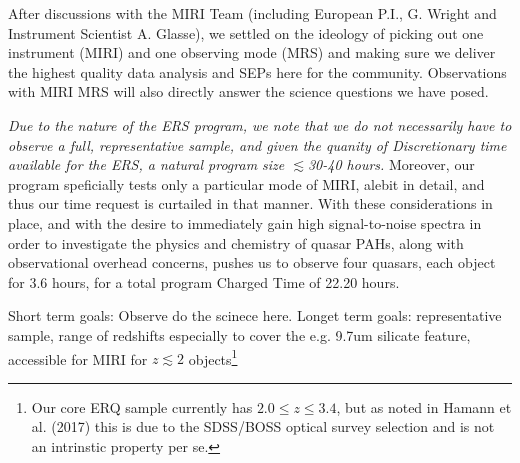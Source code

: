 \smallskip \smallskip
\noindent
After discussions with the MIRI Team (including European P.I.,
G. Wright and Instrument Scientist A. Glasse), we settled on the
ideology of picking out one instrument (MIRI) and one observing mode
(MRS) and making sure we deliver the highest quality data analysis and
SEPs here for the community. Observations with MIRI MRS will also
directly answer the science questions we have posed.

\smallskip \smallskip
\noindent
{\it Due to the nature of the ERS program, we note that we do not 
necessarily have to observe a full, representative sample, 
and given the quanity of Discretionary time available for the ERS, 
a natural program size $\lesssim$30-40 hours.} 
Moreover, our program speficially tests only a particular mode of 
MIRI, alebit in detail, and thus our time request is curtailed in that manner. 
With these considerations in place, and with the desire to immediately gain high signal-to-noise spectra
in order to investigate the physics and chemistry of quasar PAHs,
along with observational overhead concerns, pushes us to observe four 
quasars, each object for 3.6 hours, for a total program Charged Time of 22.20 hours.

\smallskip \smallskip
\noindent
Short term goals: Observe do the scinece here. 
Longet term goals: representative sample, range of redshifts 
especially to cover the e.g. 9.7um  silicate feature, accessible for MIRI 
for $z\lesssim2$ objects\footnote{Our core ERQ sample currently 
has $2.0 \leq z \leq3.4$, but as noted in Hamann et al. (2017) this
is due to the SDSS/BOSS optical survey selection and is not an intrinstic 
property per se.}

